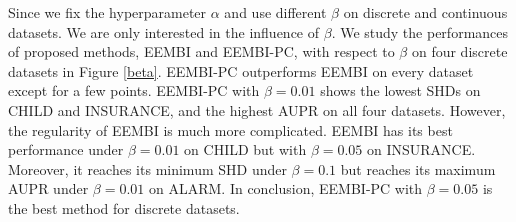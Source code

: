 \documentclass[twoside,11pt]{article}
\begin{document}
\begin{figure*}[htbp]
\centering



\caption{The SHD and AUPR of EEMBI and EEMBI-PC with respect to $\beta$ on ALARM ((a),(e)), BARLEY ((b), (f)), CHILD ((c), (g)), and INSURANCE ((d), (h))}\label{beta}
\end{figure*}



Since we fix the hyperparameter $\alpha$ and use different $\beta$ on discrete and continuous datasets. We are only interested in the influence of $\beta$. We study the performances of proposed methods, EEMBI and EEMBI-PC, with respect to $\beta$ on four discrete datasets in Figure \ref{beta}. EEMBI-PC outperforms EEMBI on every dataset except for a few points. EEMBI-PC with $\beta=0.01$ shows the lowest SHDs on CHILD and INSURANCE, and the highest AUPR on all four datasets. However, the regularity of EEMBI is much more complicated. EEMBI has its best performance under $\beta=0.01$ on CHILD but with $\beta=0.05$ on INSURANCE. Moreover, it reaches its minimum SHD under $\beta=0.1$ but reaches its maximum AUPR under $\beta=0.01$ on ALARM. In conclusion, EEMBI-PC with $\beta=0.05$ is the best method for discrete datasets.
\end{document}
